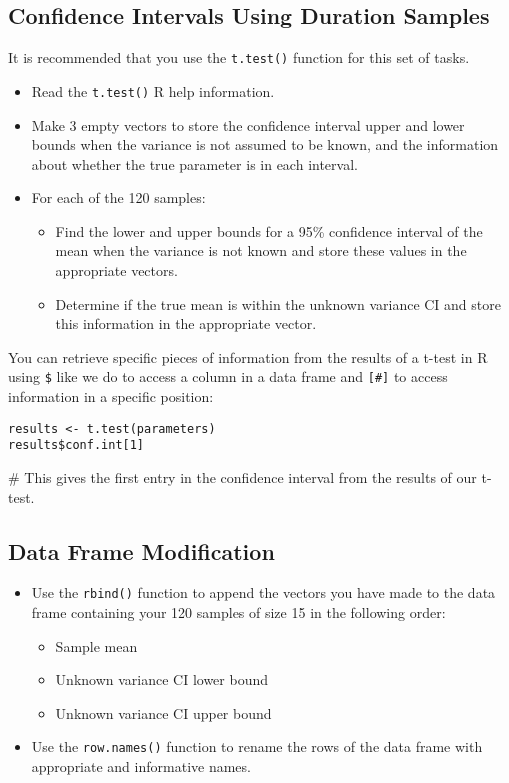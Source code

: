 \documentclass{article}
\begin{document}
\subsection{Confidence Intervals Using Duration Samples}

It is recommended that you use the \texttt{t.test()} function for this set of tasks.

\begin{itemize}
    \item Read the \texttt{t.test()} R help information.
    \item Make 3 empty vectors to store the confidence interval upper and lower bounds when the variance is not assumed to be known, and the information about whether the true parameter is in each interval.
    \item For each of the 120 samples:
    \begin{itemize}
        \item Find the lower and upper bounds for a 95\% confidence interval of the mean when the variance is not known and store these values in the appropriate vectors.
        \item Determine if the true mean is within the unknown variance CI and store this information in the appropriate vector.
    \end{itemize}
\end{itemize}

You can retrieve specific pieces of information from the results of a t-test in R using \texttt{\$} like we do to access a column in a data frame and \texttt{[\#]} to access information in a specific position:

\begin{verbatim}
results <- t.test(parameters)
results$conf.int[1]  
\end{verbatim}
# This gives the first entry in the confidence interval from the results of our t-test.

\subsection{Data Frame Modification}

\begin{itemize}
    \item Use the \texttt{rbind()} function to append the vectors you have made to the data frame containing your 120 samples of size 15 in the following order:
    \begin{itemize}
        \item Sample mean
        \item Unknown variance CI lower bound
        \item Unknown variance CI upper bound
    \end{itemize}
    \item Use the \texttt{row.names()} function to rename the rows of the data frame with appropriate and informative names.
\end{itemize}
\end{document}
